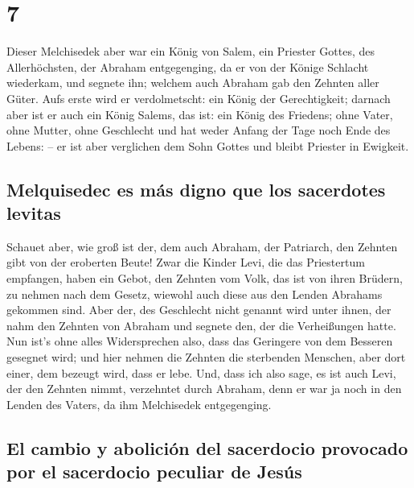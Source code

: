 \hypertarget{section-6}{%
\section{7}\label{section-6}}

 Dieser Melchisedek aber war ein König von Salem, ein
Priester Gottes, des Allerhöchsten, der Abraham entgegenging, da er von
der Könige Schlacht wiederkam, und segnete ihn;  welchem
auch Abraham gab den Zehnten aller Güter. Aufs erste wird er
verdolmetscht: ein König der Gerechtigkeit; darnach aber ist er auch ein
König Salems, das ist: ein König des Friedens;  ohne
Vater, ohne Mutter, ohne Geschlecht und hat weder Anfang der Tage noch
Ende des Lebens: -- er ist aber verglichen dem Sohn Gottes und bleibt
Priester in Ewigkeit.

\hypertarget{melquisedec-es-muxe1s-digno-que-los-sacerdotes-levitas}{%
\subsection{Melquisedec es más digno que los sacerdotes
levitas}\label{melquisedec-es-muxe1s-digno-que-los-sacerdotes-levitas}}

 Schauet aber, wie groß ist der, dem auch Abraham, der
Patriarch, den Zehnten gibt von der eroberten Beute!  Zwar
die Kinder Levi, die das Priestertum empfangen, haben ein Gebot, den
Zehnten vom Volk, das ist von ihren Brüdern, zu nehmen nach dem Gesetz,
wiewohl auch diese aus den Lenden Abrahams gekommen sind. 
Aber der, des Geschlecht nicht genannt wird unter ihnen, der nahm den
Zehnten von Abraham und segnete den, der die Verheißungen hatte.
 Nun ist's ohne alles Widersprechen also, dass das
Geringere von dem Besseren gesegnet wird;  und hier nehmen
die Zehnten die sterbenden Menschen, aber dort einer, dem bezeugt wird,
dass er lebe.  Und, dass ich also sage, es ist auch Levi,
der den Zehnten nimmt, verzehntet durch Abraham,  denn er
war ja noch in den Lenden des Vaters, da ihm Melchisedek entgegenging.

\hypertarget{el-cambio-y-aboliciuxf3n-del-sacerdocio-provocado-por-el-sacerdocio-peculiar-de-jesuxfas}{%
\subsection{El cambio y abolición del sacerdocio provocado por el
sacerdocio peculiar de
Jesús}\label{el-cambio-y-aboliciuxf3n-del-sacerdocio-provocado-por-el-sacerdocio-peculiar-de-jesuxfas}}

